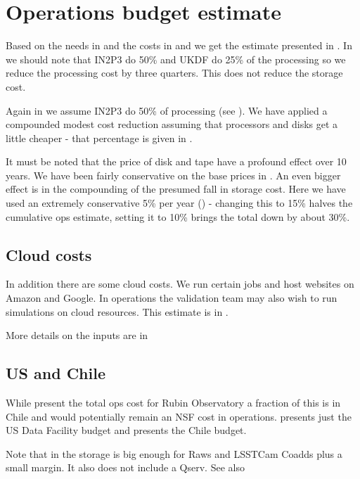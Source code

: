 \section{Operations budget estimate}\label{sec:opscost}
Based on the needs in  and the costs in  and 
we get the estimate presented in .
In  we should note that IN2P3 do 50\%  and UKDF do 25\% of the processing so we reduce the processing cost by three quarters.
This does not reduce the storage cost.



Again in  we assume IN2P3 do 50\% of processing (see ).
We have applied a compounded modest cost reduction assuming that processors  and disks get a little cheaper - that
percentage is given in .

It must be noted that the price of disk and tape have a profound effect over 10 years. We have been fairly conservative on the base prices
in . An even bigger effect is in the compounding of the presumed fall in storage cost. Here we have used an extremely
conservative 5\% per year () - changing this to 15\% halves the cumulative ops estimate, setting it to 10\% brings the
total down by about 30\%.

\subsection{Cloud costs}
In addition there are some cloud costs. We run certain jobs and host websites on Amazon and Google. In operations
the validation team may also wish to run simulations on cloud resources. This estimate is in .




More details on the inputs are in 

\subsection{US and Chile}
While  present the total ops cost for Rubin Observatory a fraction of this is in Chile and would potentially remain an NSF cost in operations.  presents just the US Data Facility budget  and
 presents the Chile budget.



Note that in  the storage is  big enough for Raws  and LSSTCam Coadds plus a small margin. It also does not include a Qserv. See also 

